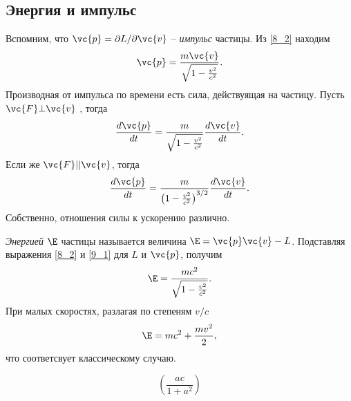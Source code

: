 \subsection{Энергия и импульс}

Вспомним, что $\vc{p} = \partial L / \partial \vc{v}$ -- \textit{импульс} частицы. Из \eqref{8_2} находим 
\begin{equation}
\label{9_1}
    \vc{p} = \frac{m \vc{v}}{\sqrt{1 - \frac{v^2}{c^2} }} .
\end{equation}
Производная от импульса по времени есть сила, действуящая на частицу. Пусть $\vc{F} \bot \vc{v}$ , тогда 
\begin{equation}
    \frac{d \vc{p}}{d t}  = \frac{m}{\sqrt{1 - \frac{v^2}{c^2} }}  \frac{d \vc{v}}{dt}.
\end{equation}
Если же $\vc{F} || \vc{v}$, тогда 
\begin{equation}
    \frac{d \vc{p}}{dt} = \frac{m}{\left(1 - \frac{v^2}{c^2} \right)^{3/2}} \frac{d \vc{v}}{d t} .
\end{equation}
Собственно, отношения силы к ускорению различно.

\textit{Энергией} $\E$ частицы называется величина $\E = \vc{p} \vc{v} - L$. Подставляя выражения \eqref{8_2} и \eqref{9_1} для $L$ и $\vc{p}$, получим
\begin{equation}
\label{9_4}
    \E = \frac{mc^2}{\sqrt{1 - \frac{v^2}{c^2}}}.
\end{equation}
При малых скоростях, разлагая по степеням $v/c$
$$
    \E = mc^2 + \frac{mv^2}{2} ,
$$
что соответсвует классическому случаю.

$$
    \left(\frac{ac}{1 + a^2} \right)
$$

